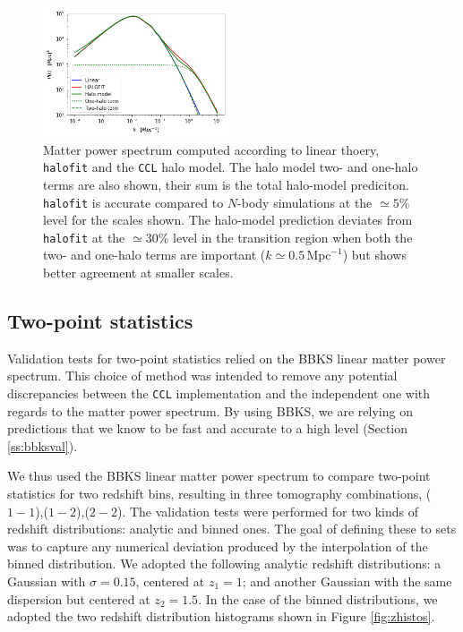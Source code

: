 \documentclass[\docopts]{\docclass}
\newcommand{\ccl}{{\tt CCL}\xspace}
\newcommand{\halofit}{{\tt halofit}\xspace}
\begin{document}
\begin{figure}
\includegraphics[width=0.49\textwidth]{halo_model.png}
\caption{Matter power spectrum computed according to linear thoery, \halofit and the \ccl halo model. The halo model two- and one-halo terms are also shown, their sum is the total halo-model prediciton. \halofit is accurate compared to $N$-body simulations at the $\simeq5\%$ level for the scales shown. The halo-model prediction deviates from \halofit at the $\simeq30\%$ level in the transition region when both the two- and one-halo terms are important ($k\simeq0.5\,\mathrm{Mpc}^{-1}$) but shows better agreement at smaller scales.}
\label{fig:halo_model}
\end{figure}


\subsection{Two-point statistics}

Validation tests for two-point statistics relied on the BBKS linear matter power spectrum. This choice of method was intended to remove any potential discrepancies between the \ccl implementation and the independent one with regards to the matter power spectrum. By using BBKS, we are relying on predictions that we know to be fast and accurate to a high level (Section \ref{ss:bbksval}).

We thus used the BBKS linear matter power spectrum to compare two-point statistics for two redshift bins, resulting in three tomography combinations, ($1-1$),($1-2$),($2-2$). The validation tests were performed for two kinds of redshift distributions: analytic and binned ones. The goal of defining these to sets was to capture any numerical deviation produced by the interpolation of the binned distribution. We adopted the following analytic redshift distributions: a Gaussian with $\sigma = 0.15$, centered at $z_1 = 1$; and another Gaussian with the same dispersion but centered at $z_2 = 1.5$. In the case of the binned distributions, we adopted the two redshift distribution histograms shown in Figure \ref{fig:zhistos}.
\end{document}
